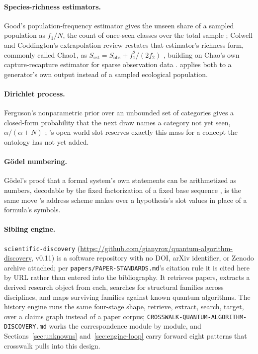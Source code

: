 \documentclass[11pt]{article}
\begin{document}
\paragraph{Species-richness estimators.} Good's population-frequency
estimator gives the unseen share of a sampled population as $f_1/N$, the
count of once-seen classes over the total sample
\autocite{good1953population}; Colwell and Coddington's extrapolation
review restates that estimator's richness form, commonly called Chao1,
as $S_{\mathrm{est}} = S_{\mathrm{obs}} + f_1^2/(2f_2)$
\autocite{colwell1994estimating}, building on Chao's own capture-recapture
estimator for sparse observation data \autocite{chao1987estimating}.
 applies both to a generator's own output instead of a
sampled ecological population.

\paragraph{Dirichlet process.} Ferguson's nonparametric prior over an
unbounded set of categories gives a closed-form probability that the next
draw names a category not yet seen, $\alpha/(\alpha+N)$
\autocite{ferguson1973bayesian}; 's open-world slot
reserves exactly this mass for a concept the ontology has not yet added.

\paragraph{Gödel numbering.} Gödel's proof that a formal system's own
statements can be arithmetized as numbers, decodable by the fixed
factorization of a fixed base sequence \autocite{godel1931unentscheidbare},
is the same move 's address scheme makes over a
hypothesis's slot values in place of a formula's symbols.

\paragraph{Sibling engine.} \texttt{scientific-discovery}
(\url{https://github.com/gianyrox/quantum-algorithm-discovery}, v0.11) is
a software repository with no DOI, arXiv identifier, or Zenodo archive
attached; per \texttt{papers/PAPER-STANDARDS.md}'s citation rule it is
cited here by URL rather than entered into the bibliography. It
retrieves papers, extracts a derived research object from each, searches
for structural families across disciplines, and maps surviving families
against known quantum algorithms. The history engine runs the same
four-stage shape, retrieve, extract, search, target, over a claims graph
instead of a paper corpus; \texttt{CROSSWALK-QUANTUM-ALGORITHM-
DISCOVERY.md} works the correspondence module by module, and
Sections~\ref{sec:unknowns} and~\ref{sec:engine-loop} carry forward eight
patterns that crosswalk pulls into this design.
\end{document}
